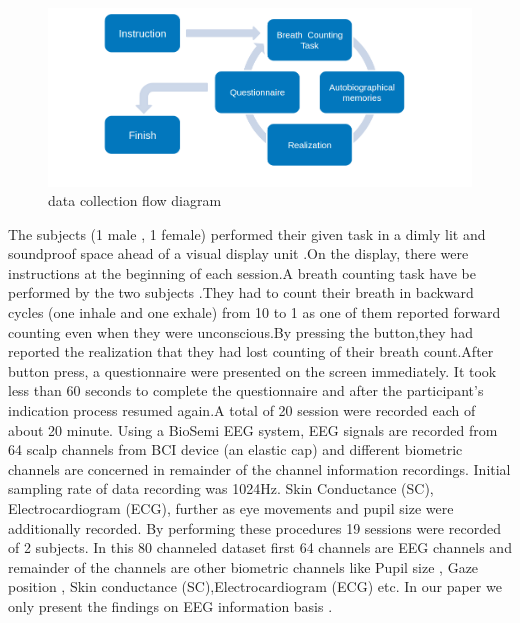  \begin{figure}
    \centering
    \includegraphics[width=15cm]{Pictures/data_collection.png}
    \caption{data collection flow diagram }
    \label{fig:data_collection}
\end{figure}

The subjects (1 male , 1 female) performed their given task in a dimly lit and soundproof space ahead of a visual display unit .On the display, there were instructions at the beginning of each session.A breath counting task have be performed by the two subjects .They had to count their breath in backward cycles (one inhale and one exhale) from 10 to 1 as one of them reported forward counting even when they were unconscious.By pressing the button,they had reported the realization that they had lost counting of their breath count.After button press, a questionnaire were presented on the screen immediately. It took less than 60 seconds to complete the questionnaire and after the participant's indication process resumed again.A total of 20 session were recorded each of about 20 minute. Using a BioSemi EEG system, EEG signals are recorded from 64 scalp channels from BCI device (an elastic cap) and different biometric channels are concerned in remainder of the channel information recordings. Initial sampling rate of data recording was 1024Hz. Skin Conductance (SC), Electrocardiogram (ECG), further as eye movements and pupil size were additionally recorded. By performing these procedures 19 sessions were recorded of 2 subjects. In this 80 channeled dataset first 64 channels are EEG channels and remainder of the channels are other biometric channels like Pupil size , Gaze position , Skin conductance (SC),Electrocardiogram (ECG) etc. In our paper we only present the findings on EEG information basis .

